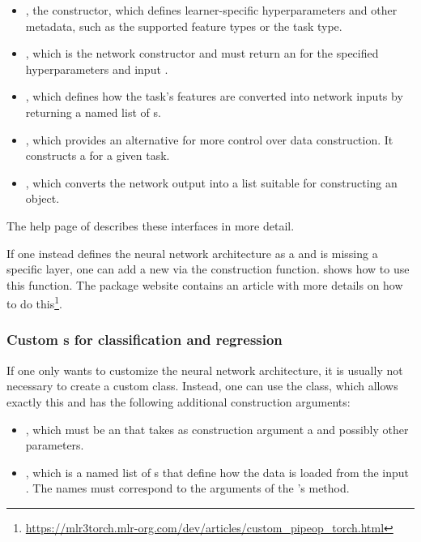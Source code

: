 \documentclass[article,shortnames]{jss}
\theoremstyle{definition}
\begin{document}
\begin{itemize}
    \item {}, the constructor, which defines learner-specific hyperparameters and other metadata, such as the supported feature types or the task type.
    \item {}, which is the network constructor and must return an  for the specified hyperparameters and input .
    \item {}, which defines how the task's features are converted into network inputs by returning a named list of s.
    \item {}, which provides an alternative for more control over data construction. It constructs a  for a given task.
    \item {}, which converts the network output into a list suitable for constructing an  object.
\end{itemize}

The help page of  describes these interfaces in more detail.

If one instead defines the neural network architecture as a  and is missing a specific layer, one can add a new  via the  construction function.
 shows how to use this function.
The package website contains an article with more details on how to do this\footnote{\url{https://mlr3torch.mlr-org.com/dev/articles/custom_pipeop_torch.html}}.

\subsubsection[Custom Learners for classification and regression]{Custom s for classification and regression}\label{sec:extending-learner}

If one only wants to customize the neural network architecture, it is usually not necessary to create a custom class.
Instead, one can use the  class, which allows exactly this and has the following additional construction arguments:
\begin{itemize}
    \item {}, which must be an  that takes as construction argument a  and possibly other parameters.
    \item {}, which is a named list of s that define how the data is loaded from the input . The names must correspond to the arguments of the 's  method.
\end{itemize}
\end{document}
